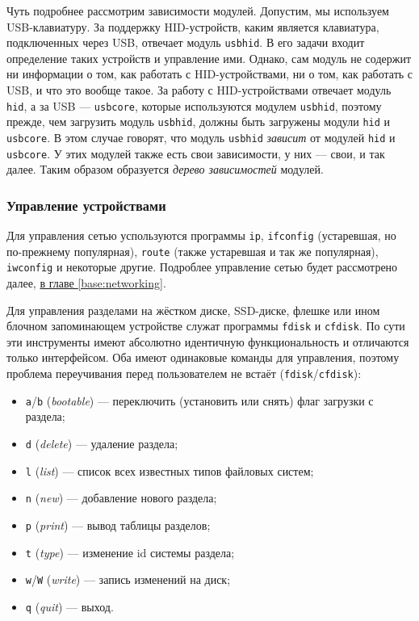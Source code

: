  Чуть подробнее рассмотрим зависимости модулей. Допустим, мы используем USB-клавиатуру. За поддержку HID-устройств, каким является клавиатура, подключенных через USB, отвечает модуль \texttt{usbhid}. В его задачи входит определение таких устройств и управление ими. Однако, сам модуль не содержит ни информации о том, как работать с HID-устройствами, ни о том, как работать с USB, и что это вообще такое.
 За работу с HID-устройствами отвечает модуль \texttt{hid}, а за USB --- \texttt{usbcore}, которые используются модулем \texttt{usbhid}, поэтому прежде, чем загрузить модуль \texttt{usbhid}, должны быть загружены модули \texttt{hid} и \texttt{usbcore}. В этом случае говорят, что модуль \texttt{usbhid} \emph{зависит} от модулей \texttt{hid} и \texttt{usbcore}. У этих модулей также есть свои зависимости, у них --- свои, и так далее. Таким образом образуется \emph{дерево зависимостей} модулей.

\subsubsection{Управление устройствами}\label{base:os:structure:sysutils:devices}
 Для управления сетью успользуются программы \texttt{ip}, \texttt{ifconfig} (устаревшая, но по-прежнему популярная), \texttt{route} (также устаревшая и так же популярная), \texttt{iwconfig} и некоторые другие. Подроблее управление сетью будет рассмотрено далее, \hyperref[base:networking]{в главе \ref*{base:networking}}.

 Для управления разделами на жёстком диске, SSD-диске, флешке или ином блочном запоминающем устройстве служат программы \texttt{fdisk} и \texttt{cfdisk}. По сути эти инструменты имеют абсолютно идентичную функциональность и отличаются только интерфейсом. Оба имеют одинаковые команды для управления, поэтому проблема переучивания перед пользователем не встаёт (\texttt{fdisk}/\texttt{cfdisk}):
 \begin{itemize}
  \item \texttt{a}/\texttt{b} (\emph{bootable}) --- переключить (установить или снять) флаг загрузки с раздела;
  \item \texttt{d} (\emph{delete}) --- удаление раздела;
  \item \texttt{l} (\emph{list}) --- список всех известных типов файловых систем;
  \item \texttt{n} (\emph{new}) --- добавление нового раздела;
  \item \texttt{p} (\emph{print}) --- вывод таблицы разделов;
  \item \texttt{t} (\emph{type}) --- изменение id системы раздела;
  \item \texttt{w}/\texttt{W} (\emph{write}) --- запись изменений на диск;
  \item \texttt{q} (\emph{quit}) --- выход.
 \end{itemize}
 
